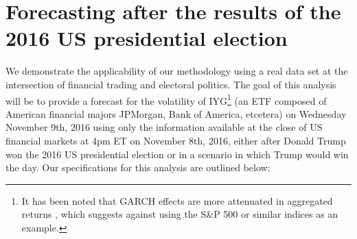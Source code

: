 \documentclass{uiucthesis2021}
\theoremstyle{definition}
\begin{document}
\clearpage 

\section{Forecasting after the results of the 2016 US presidential election}\label{Real Data Example}

We demonstrate the applicability of our methodology using a real data set at the intersection of financial trading and electoral politics. The goal of this analysis will be to provide a forecast for the volatility of IYG\footnote{It has been noted that GARCH effects are more attenuated in aggregated returns \citep{zivot2009practical}, which suggests against using the S\&P 500 or similar indices as an example.} (an ETF composed of American financial majors JPMorgan, Bank of America, etcetera) on Wednesday November 9th, 2016 using only the information available at the close of US financial markets at 4pm ET on November 8th, 2016, either after Donald Trump won the 2016 US presidential election or in a scenario in which Trump would win the day. Our specifications for this analysis are outlined below:


\end{document}
